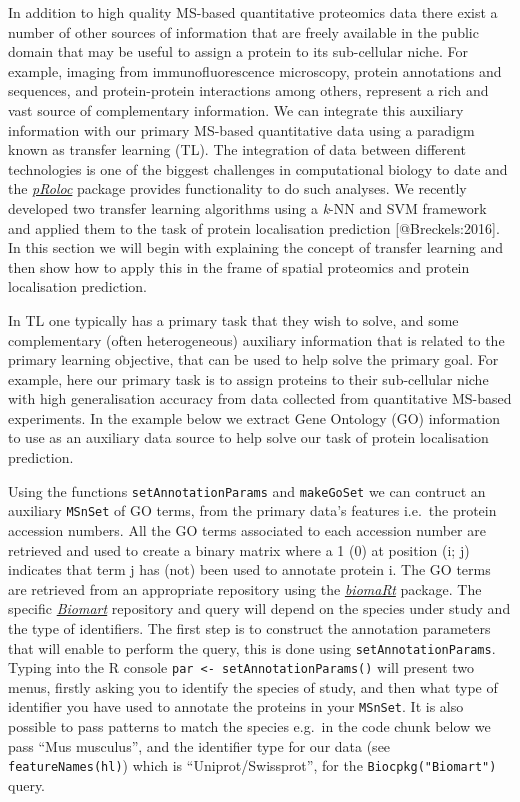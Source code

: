 In addition to high quality MS-based quantitative proteomics data there
exist a number of other sources of information that are freely available
in the public domain that may be useful to assign a protein to its
sub-cellular niche. For example, imaging from immunofluorescence
microscopy, protein annotations and sequences, and protein-protein
interactions among others, represent a rich and vast source of
complementary information. We can integrate this auxiliary information
with our primary MS-based quantitative data using a paradigm known as
transfer learning (TL). The integration of data between different
technologies is one of the biggest challenges in computational biology
to date and the
\emph{\href{http://bioconductor.org/packages/pRoloc}{pRoloc}} package
provides functionality to do such analyses. We recently developed two
transfer learning algorithms using a \emph{k}-NN and SVM framework and
applied them to the task of protein localisation prediction
{[}@Breckels:2016{]}. In this section we will begin with explaining the
concept of transfer learning and then show how to apply this in the
frame of spatial proteomics and protein localisation prediction.

In TL one typically has a primary task that they wish to solve, and some
complementary (often heterogeneous) auxiliary information that is
related to the primary learning objective, that can be used to help
solve the primary goal. For example, here our primary task is to assign
proteins to their sub-cellular niche with high generalisation accuracy
from data collected from quantitative MS-based experiments. In the
example below we extract Gene Ontology (GO) information to use as an
auxiliary data source to help solve our task of protein localisation
prediction.

Using the functions \texttt{setAnnotationParams} and \texttt{makeGoSet}
we can contruct an auxiliary \texttt{MSnSet} of GO terms, from the
primary data's features i.e.~the protein accession numbers. All the GO
terms associated to each accession number are retrieved and used to
create a binary matrix where a 1 (0) at position (i; j) indicates that
term j has (not) been used to annotate protein i. The GO terms are
retrieved from an appropriate repository using the
\emph{\href{http://bioconductor.org/packages/biomaRt}{biomaRt}} package.
The specific
\emph{\href{http://bioconductor.org/packages/Biomart}{Biomart}}
repository and query will depend on the species under study and the type
of identifiers. The first step is to construct the annotation parameters
that will enable to perform the query, this is done using
\texttt{setAnnotationParams}. Typing into the R console
\texttt{par \textless{}- setAnnotationParams()} will present two menus,
firstly asking you to identify the species of study, and then what type
of identifier you have used to annotate the proteins in your
\texttt{MSnSet}. It is also possible to pass patterns to match the
species e.g.~in the code chunk below we pass ``Mus musculus'', and the
identifier type for our data (see \texttt{featureNames(hl)}) which is
``Uniprot/Swissprot'', for the \texttt{Biocpkg("Biomart")} query.


